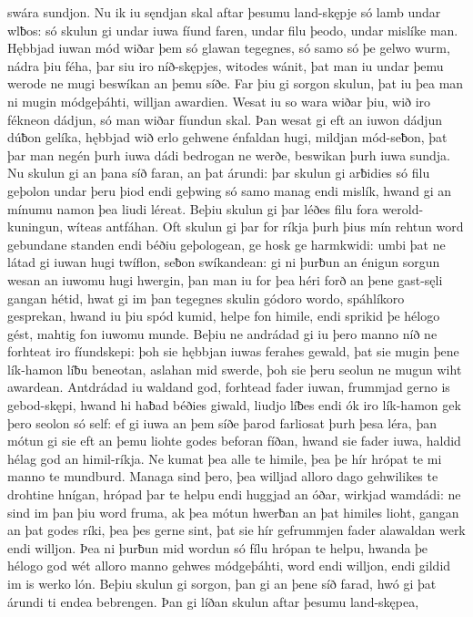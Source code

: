 swára sundjon. Nu ik iu sęndjan skal
aftar þesumu land-skępje só lamb undar wlƀos:
só skulun gi undar iuwa fíund faren, undar filu þeodo,
undar mislíke man. Hębbjad iuwan mód wiðar þem
só glawan tegegnes, só samo só þe gelwo wurm,
nádra þiu féha, þar siu iro níð-skępjes,
witodes wánit, þat man iu undar þemu werode ne mugi
beswíkan an þemu síðe. Far þiu gi sorgon skulun,
þat iu þea man ni mugin módgeþáhti,
willjan awardien. Wesat iu so wara wiðar þiu,
wið iro fékneon dádjun, só man wiðar fíundun skal.
Þan wesat gi eft an iuwon dádjun dúƀon gelíka,
hębbjad wið erlo gehwene énfaldan hugi,
mildjan mód-seƀon, þat þar man negén
þurh iuwa dádi bedrogan ne werðe,
beswikan þurh iuwa sundja. Nu skulun gi an þana síð faran,
an þat árundi: þar skulun gi arƀidies só filu
geþolon undar þeru þiod endi geþwing só samo
manag endi mislík, hwand gi an mínumu namon
þea liudi léreat. Beþiu skulun gi þar léðes filu
fora werold-kuningun, wíteas antfáhan.
Oft skulun gi þar for ríkja þurh þius mín rehtun word
gebundane standen endi béðiu geþologean,
ge hosk ge harmkwidi: umbi þat ne látad gi iuwan hugi twíflon,
seƀon swíkandean: gi ni þurƀun an énigun sorgun wesan
an iuwomu hugi hwergin, þan man iu for þea héri forð
an þene gast-sęli gangan hétid,
hwat gi im þan tegegnes skulin gódoro wordo,
spáhlíkoro gesprekan, hwand iu þiu spód kumid,
helpe fon himile, endi sprikid þe hélogo gést,
mahtig fon iuwomu munde. Beþiu ne andrádad gi iu þero manno níð
ne forhteat iro fíundskepi: þoh sie hębbjan iuwas ferahes gewald,
þat sie mugin þene lík-hamon líƀu beneotan,
aslahan mid swerde, þoh sie þeru seolun ne mugun
wiht awardean. Antdrádad iu waldand god,
forhtead fader iuwan, frummjad gerno
is gebod-skępi, hwand hi haƀad béðies giwald,
liudjo líƀes endi ók iro lík-hamon
gek þero seolon só self: ef gi iuwa an þem síðe þarod
farliosat þurh þesa léra, þan mótun gi sie eft an þemu liohte godes
beforan fíðan, hwand sie fader iuwa,
haldid hélag god an himil-ríkja.
Ne kumat þea alle te himile, þea þe hír hrópat te mi
manno te mundburd. Managa sind þero,
þea willjad alloro dago gehwilikes te drohtine hnígan,
hrópad þar te helpu endi huggjad an óðar,
wirkjad wamdádi: ne sind im þan þiu word fruma,
ak þea mótun hwerƀan an þat himiles lioht,
gangan an þat godes ríki, þea þes gerne sint,
þat sie hír gefrummjen fader alawaldan
werk endi willjon. Þea ni þurƀun mid wordun só fílu
hrópan te helpu, hwanda þe hélogo god
wét alloro manno gehwes módgeþáhti,
word endi willjon, endi gildid im is werko lón.
Beþiu skulun gi sorgon, þan gi an þene síð farad,
hwó gi þat árundi ti endea bebrengen.
Þan gi líðan skulun aftar þesumu land-skępea,
